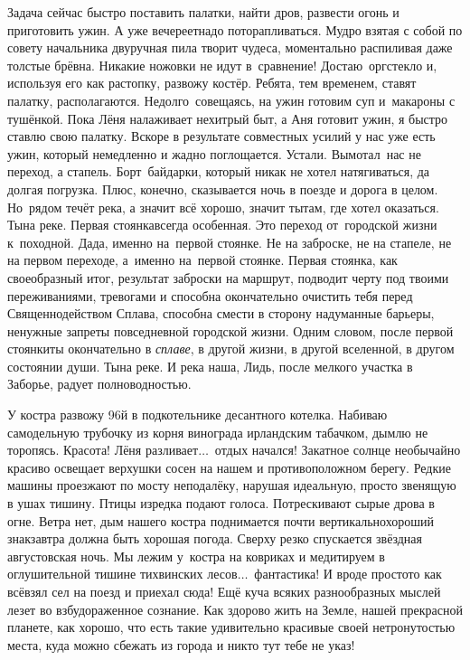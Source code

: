 Задача сейчас быстро поставить палатки, найти дров, развести огонь и приготовить ужин. А уже вечереет\mdash надо поторапливаться. Мудро взятая с собой по совету начальника двуручная пила творит чудеса, моментально распиливая даже толстые брёвна. Никакие ножовки не идут в~сравнение! Достаю~оргстекло и, используя его как растопку, развожу костёр. Ребята, тем временем, ставят палатку, располагаются. Недолго~совещаясь, на ужин готовим суп и~макароны с тушёнкой. Пока Лёня налаживает нехитрый быт, а Аня готовит ужин, я быстро ставлю свою палатку. Вскоре в результате совместных усилий у нас уже есть ужин, который немедленно и жадно поглощается. Устали. Вымотал~нас не переход, а стапель. Борт~байдарки, который никак не хотел натягиваться, да долгая погрузка. Плюс, конечно, сказывается ночь в поезде и дорога в целом. Но~рядом течёт река, а значит всё хорошо, значит ты\mdash там, где хотел оказаться. Ты\mdash на реке. 
\newpage
Первая стоянка\mdash всегда особенная. Это переход от~городской жизни к~походной. Да\sdash да, именно на~первой стоянке. Не на заброске, не на стапеле, не на первом переходе, а~именно на~первой стоянке. Первая стоянка, как своеобразный итог, результат заброски на маршрут, подводит черту под твоими переживаниями, тревогами и способна окончательно очистить тебя перед Священнодейством Сплава, способна смести в сторону надуманные барьеры, ненужные запреты повседневной городской жизни. Одним словом, после первой стоянки\mdash ты окончательно в \textit{сплаве}, в другой жизни, в другой вселенной, в другом состоянии души. Ты\mdash на реке. И река наша, Лидь, после мелкого участка в Заборье, радует полноводностью.

У костра развожу 96\sdash й в подкотельнике десантного котелка. Набиваю самодельную трубочку из корня винограда ирландским табачком, дымлю не торопясь. Красота! Лёня разливает$\ldots$~отдых начался! Закатное солнце необычайно красиво освещает верхушки сосен на нашем и противоположном берегу. Редкие машины проезжают по мосту неподалёку, нарушая идеальную, просто звенящую в ушах тишину. Птицы изредка подают голоса. Потрескивают сырые дрова в огне. Ветра нет, дым нашего костра поднимается почти вертикально\mdash хороший знак\mdash завтра должна быть хорошая погода. Сверху резко спускается звёздная августовская ночь. Мы лежим у~костра на ковриках и медитируем в оглушительной тишине тихвинских лесов$\ldots$~фантастика! И вроде просто\sdash то как всё\mdash взял сел на поезд и приехал сюда! Ещё куча всяких разнообразных мыслей лезет во взбудораженное сознание. Как здорово жить на Земле, нашей прекрасной планете, как хорошо, что есть такие удивительно красивые своей нетронутостью места, куда можно сбежать из города и никто тут тебе не указ!

